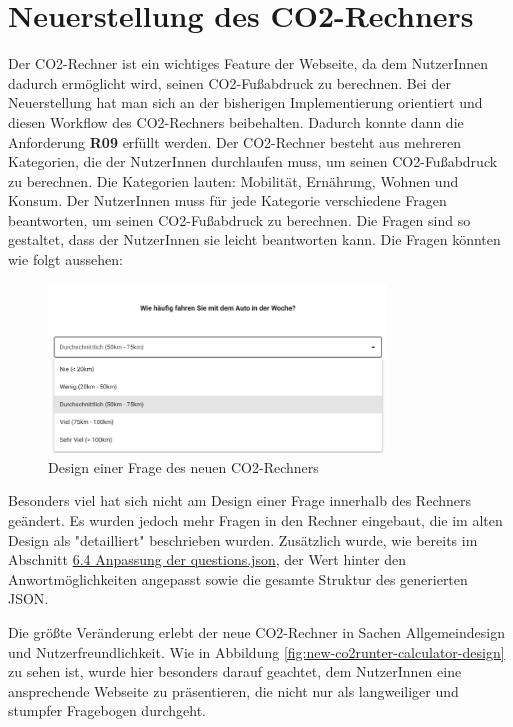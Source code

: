 \section{Neuerstellung des CO2-Rechners}
\label{chapter:neuerstellung_co2rechner}


Der CO2-Rechner ist ein wichtiges Feature der Webseite, da dem NutzerInnen dadurch ermöglicht wird, seinen CO2-Fußabdruck zu berechnen. Bei der Neuerstellung hat man sich an der bisherigen Implementierung orientiert und diesen Workflow des CO2-Rechners beibehalten. Dadurch konnte dann die Anforderung \textbf{R09} erfüllt werden. Der CO2-Rechner besteht aus mehreren Kategorien, die der NutzerInnen durchlaufen muss, um seinen CO2-Fußabdruck zu berechnen. Die Kategorien lauten: Mobilität, Ernährung, Wohnen und Konsum. Der NutzerInnen muss für jede Kategorie verschiedene Fragen beantworten, um seinen CO2-Fußabdruck zu berechnen. Die Fragen sind so gestaltet, dass der NutzerInnen sie leicht beantworten kann. Die Fragen könnten wie folgt aussehen:

\begin{figure}[H]
    \centering
    \includegraphics[width=0.8\textwidth]{images/06/Question_New_Design.png}
    \caption{Design einer Frage des neuen CO2-Rechners}
    \label{fig:new-co2runter-question-design}
\end{figure}

Besonders viel hat sich nicht am Design einer Frage innerhalb des Rechners geändert.
Es wurden jedoch mehr Fragen in den Rechner eingebaut, die im alten Design als "detailliert" beschrieben wurden.
Zusätzlich wurde, wie bereits im Abschnitt \hyperref[sec:anpassung-der-questions-json]{6.4 Anpassung der questions.json}, der Wert hinter den Anwortmöglichkeiten angepasst sowie die gesamte Struktur des generierten \acs{JSON}.

Die größte Veränderung erlebt der neue CO2-Rechner in Sachen Allgemeindesign und Nutzerfreundlichkeit.
Wie in Abbildung \ref{fig:new-co2runter-calculator-design} zu sehen ist, wurde hier besonders darauf geachtet, dem NutzerInnen eine ansprechende Webseite zu präsentieren, die nicht nur als langweiliger und stumpfer Fragebogen durchgeht.

